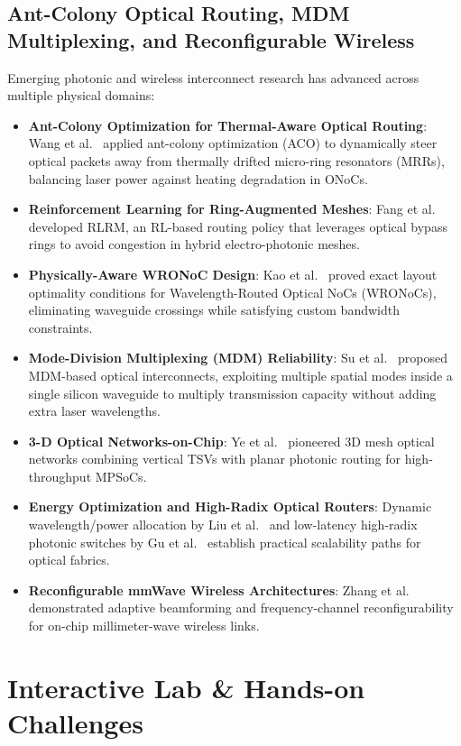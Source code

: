 \subsection{Ant-Colony Optical Routing, MDM Multiplexing, and Reconfigurable Wireless}
\label{sec:ch10_recent_frontiers}
Emerging photonic and wireless interconnect research has advanced across multiple physical domains:
\begin{itemize}
    \item \textbf{Ant-Colony Optimization for Thermal-Aware Optical Routing}: Wang et al.~\cite{Wang2021ACO} applied ant-colony optimization (ACO) to dynamically steer optical packets away from thermally drifted micro-ring resonators (MRRs), balancing laser power against heating degradation in ONoCs.
    \item \textbf{Reinforcement Learning for Ring-Augmented Meshes}: Fang et al.~\cite{Fang2026RLRM} developed RLRM, an RL-based routing policy that leverages optical bypass rings to avoid congestion in hybrid electro-photonic meshes.
    \item \textbf{Physically-Aware WRONoC Design}: Kao et al.~\cite{Kao2026WR} proved exact layout optimality conditions for Wavelength-Routed Optical NoCs (WRONoCs), eliminating waveguide crossings while satisfying custom bandwidth constraints.
    \item \textbf{Mode-Division Multiplexing (MDM) Reliability}: Su et al.~\cite{Su2026MDM} proposed MDM-based optical interconnects, exploiting multiple spatial modes inside a single silicon waveguide to multiply transmission capacity without adding extra laser wavelengths.
    \item \textbf{3-D Optical Networks-on-Chip}: Ye et al.~\cite{Ye2013ONoC} pioneered 3D mesh optical networks combining vertical TSVs with planar photonic routing for high-throughput MPSoCs.
    \item \textbf{Energy Optimization and High-Radix Optical Routers}: Dynamic wavelength/power allocation by Liu et al.~\cite{Liu2025Energy} and low-latency high-radix photonic switches by Gu et al.~\cite{Gu2025Radix} establish practical scalability paths for optical fabrics.
    \item \textbf{Reconfigurable mmWave Wireless Architectures}: Zhang et al.~\cite{Zhang2025Wireless} demonstrated adaptive beamforming and frequency-channel reconfigurability for on-chip millimeter-wave wireless links.
\end{itemize}

\section{Interactive Lab \& Hands-on Challenges}
\label{sec:ch10_interactive}

